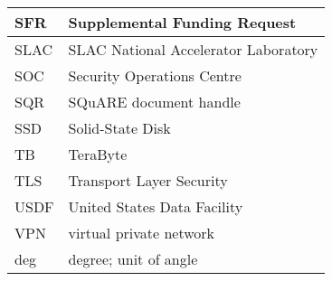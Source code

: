 \begin{longtable}{p{}p{}}
SFR & Supplemental Funding Request \\\hline
SLAC & SLAC National Accelerator Laboratory \\\hline
SOC & Security Operations Centre \\\hline
SQR & SQuARE document handle \\\hline
SSD & Solid-State Disk \\\hline
TB & TeraByte \\\hline
TLS & Transport Layer Security \\\hline
USDF & United States Data Facility \\\hline
VPN & virtual private network \\\hline
deg & degree; unit of angle \\\hline
\end{longtable}
